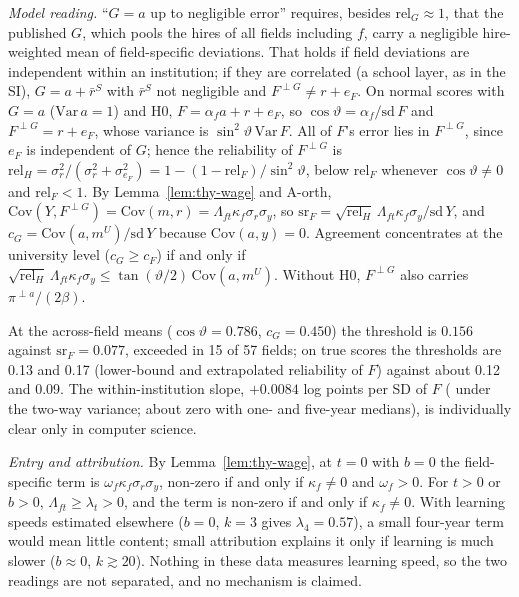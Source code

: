 \emph{Model reading.} ``$G=a$ up to negligible error'' requires, besides $\mathrm{rel}_G\approx1$, that the
published $G$, which pools the hires of all fields including $f$, carry a negligible hire-weighted mean of
field-specific deviations. That holds if field deviations are independent within an institution; if they are
correlated (a school layer, as in the SI), $G=a+\bar r^S$ with $\bar r^S$ not negligible and $F^{\perp G}\neq r+e_F$.
On normal scores with $G=a$ ($\mathrm{Var}\,a=1$) and H0, $F=\alpha_fa+r+e_F$, so $\cos\vartheta=\alpha_f/\mathrm{sd}\,F$
and $F^{\perp G}=r+e_F$, whose variance is $\sin^2\vartheta\,\mathrm{Var}\,F$. All of $F$'s error lies in
$F^{\perp G}$, since $e_F$ is independent of $G$; hence the reliability of $F^{\perp G}$ is
$\mathrm{rel}_H=\sigma_r^2/(\sigma_r^2+\sigma_{e_F}^2)=1-(1-\mathrm{rel}_F)/\sin^2\vartheta$, below $\mathrm{rel}_F$
whenever $\cos\vartheta\neq0$ and $\mathrm{rel}_F<1$. By Lemma~\ref{lem:thy-wage} and A-orth,
$\mathrm{Cov}(Y,F^{\perp G})=\mathrm{Cov}(m,r)=\Lambda_{ft}\kappa_f\sigma_r\sigma_y$, so
$\mathrm{sr}_F=\sqrt{\mathrm{rel}_H}\,\Lambda_{ft}\kappa_f\sigma_y/\mathrm{sd}\,Y$, and
$c_G=\mathrm{Cov}(a,m^U)/\mathrm{sd}\,Y$ because $\mathrm{Cov}(a,y)=0$. Agreement concentrates at the university
level ($c_G\ge c_F$) if and only if
$\sqrt{\mathrm{rel}_H}\,\Lambda_{ft}\kappa_f\sigma_y\le\tan(\vartheta/2)\,\mathrm{Cov}(a,m^U)$. Without H0,
$F^{\perp G}$ also carries $\pi^{\perp a}/(2\beta)$. \thyqed

At the across-field means ($\cos\vartheta=0.786$, $c_G=0.450$) the threshold is $0.156$ against
$\mathrm{sr}_F=0.077$, exceeded in 15 of 57 fields; on true scores the thresholds are 0.13 and 0.17 (lower-bound and
extrapolated reliability of $F$) against about 0.12 and 0.09. The within-institution slope,
$+0.0084$  log points per SD of $F$ ( under the two-way
variance; about zero with one- and five-year medians), is individually clear only in computer science.

\emph{Entry and attribution.} By Lemma~\ref{lem:thy-wage}, at $t=0$ with $b=0$ the field-specific term is
$\omega_f\kappa_f\sigma_r\sigma_y$, non-zero if and only if $\kappa_f\neq0$ and $\omega_f>0$. For $t>0$ or $b>0$,
$\Lambda_{ft}\ge\lambda_t>0$, and the term is non-zero if and only if $\kappa_f\neq0$. With learning speeds estimated
elsewhere \citep{lange2007speed,arcidiacono2010beyond} ($b=0$, $k=3$ gives $\lambda_4=0.57$), a small four-year term
would mean little content; small attribution explains it only if learning is much slower ($b\approx0$, $k\gtrsim20$).
Nothing in these data measures learning speed, so the two readings are not separated, and no mechanism is claimed.

